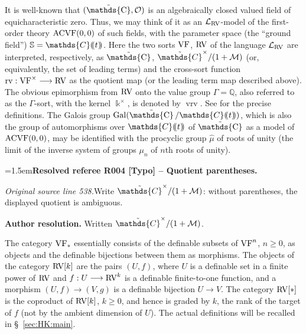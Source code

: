 \documentclass[12pt]{amsart}
\newcommand{\ResolvedRefereeRemark}[5]{%
  \par\medskip\begingroup\normalfont\small\color{gray}%
  \emergencystretch=1.5em\noindent\textbf{Resolved referee R#1 [#2] -- #3.}\par\nobreak\noindent #4\par
  \medskip\color{ResolutionGreen}\noindent\textbf{Author resolution.} #5\par
  \endgroup\medskip
}
\theoremstyle{plain}
\theoremstyle{definition}
\theoremstyle{remark}
\numberwithin{equation}{section}
\theoremstyle{plain}
\newcommand{\VF}{\textup{VF}}
\newcommand{\ACVF}{\textup{ACVF}}
\newcommand{\RV}{\textup{RV}}
\newcommand{\MM}{\mdl M}
\newcommand{\OO}{\mdl O}
\DeclareMathOperator{\K}{\mathds{k}}
\newcommand{\C}{\mathds{C}}
\newcommand{\Q}{\mathds{Q}}
\newcommand{\0}{\emptyset}
\newcommand{\dpar}[1]{%
   (\mkern-4mu (#1 )\mkern-4mu )}
\newcommand{\lan}[3]{\mathcal{L}_{#1 \textup{#2} #3}}
\newcommand{\mdl}[1]{\mathcal{#1}}  %
\newcommand{\bb}[1]{\mathbb{#1}}
\newcommand{\fun}{\longrightarrow}
\DeclareMathOperator{\rv}{rv}
\DeclareMathOperator{\vrv}{vrv}
\DeclareMathOperator{\gal}{Gal}
\DeclareMathOperator{\puC}{\tilde \C}
\begin{document}
It is well-known that $(\puC, \OO)$ is an algebraically closed valued field of equicharacteristic zero. Thus, we may  think of it as an $\lan{}{RV}{}$-model of the first-order theory $\ACVF(0,0)$ of such fields, with the parameter space (the ``ground field'') $\bb S = \C \dpar t$.  Here  the two sorts $\VF$, $\RV$ of the language $\lan{}{RV}{}$ are  interpreted, respectively, as $\puC$, $\tilde \C^\times / (1 + \MM)$ (or, equivalently, the set of leading terms) and the cross-sort function $\rv : \VF^\times \fun \RV$ as the quotient map (or the leading term map described above). The obvious epimorphism from $\RV$ onto the value group $\Gamma = \Q$, also referred to as the $\Gamma$-sort, with the kernel $\K^\times$, is denoted by $\vrv$. See \cite[\S~2]{Yin:special:trans} for the precise definitions. The Galois group $\gal(\puC / \C \dpar t)$, which  is also the group of automorphisms over $\C \dpar t$ of $\puC$ as a model of $\ACVF(0,0)$, may be identified with the procyclic group $\hat \mu$ of roots of unity (the limit of the inverse system of groups $\mu_n$ of $n$th roots of unity).

\ResolvedRefereeRemark{004}{Typo}{Quotient parentheses}{%
\textit{Original source line 538.}\quad Write $\tilde\C^{\times}/(1+\MM)$: without parentheses, the displayed quotient is ambiguous.
}{Written $\tilde\C^{\times}/(1+\MM)$.}



The category $\VF_*$ essentially consists of the definable subsets of $\VF^n$, $n \geq 0$, as objects and the definable bijections between them as morphisms. The objects of the category $\RV[k]$ are the pairs $(U, f)$, where $U$ is a definable set in a finite power of $\RV$ and $f : U \fun \RV^k$ is a definable finite-to-one function, and a morphism $(U, f) \fun (V, g)$ is a definable bijection $U \fun V$. The category  $\RV[*]$  is the coproduct of $\RV[k]$, $k \geq 0$, and hence is graded by $k$, the rank of the target of $f$ (not by the ambient dimension of $U$). The actual definitions will be recalled in \S~\ref{sec:HK:main}.
\end{document}
